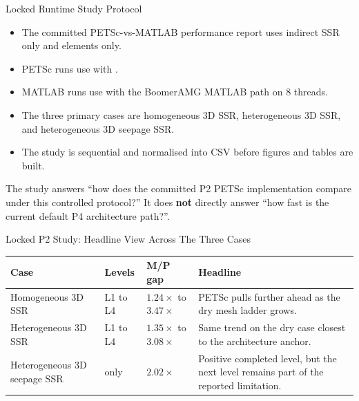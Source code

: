 \documentclass[aspectratio=169,10pt]{beamer}
\begin{document}

\begin{frame}{Locked Runtime Study Protocol}
\small
\begin{softbox}
\begin{itemize}
  \item The committed PETSc-vs-MATLAB performance report uses indirect SSR only and  elements only.
  \item PETSc runs use  with .
  \item MATLAB runs use  with the BoomerAMG MATLAB path on 8 threads.
  \item The three primary cases are homogeneous 3D SSR, heterogeneous 3D SSR, and heterogeneous 3D seepage SSR.
  \item The study is sequential and normalised into CSV before figures and tables are built.
\end{itemize}
\end{softbox}
\vspace{0.18cm}
\begin{callout}
The study answers ``how does the committed P2 PETSc implementation compare under this controlled protocol?'' It does \textbf{not} directly answer ``how fast is the current default P4 architecture path?''.
\end{callout}
\end{frame}

\begin{frame}{Locked P2 Study: Headline View Across The Three Cases}
\small
\begin{tabularx}{\textwidth}{p{}p{}p{}Y}
\toprule
\textbf{Case} & \textbf{Levels} & \textbf{M/P gap} & \textbf{Headline} \\
\midrule
Homogeneous 3D SSR & L1 to L4 & \(1.24\times\) to \(3.47\times\) & PETSc pulls further ahead as the dry mesh ladder grows. \\
Heterogeneous 3D SSR & L1 to L4 & \(1.35\times\) to \(3.08\times\) & Same trend on the dry case closest to the architecture anchor. \\
Heterogeneous 3D seepage SSR &  only & \(2.02\times\) & Positive completed level, but the next level remains part of the reported limitation. \\
\bottomrule
\end{tabularx}
\end{frame}
\end{document}
